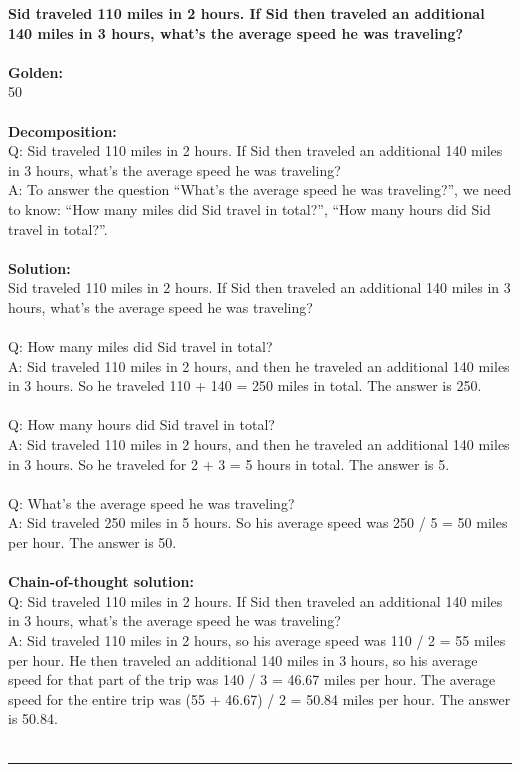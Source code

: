 \noindent
\textbf{Sid traveled 110 miles in 2 hours. If Sid then traveled an additional 140 miles in 3 hours, what's the average speed he was traveling?} \\
 \\
\textbf{Golden:} \\
50 \\
 \\
\textbf{Decomposition:} \\
Q: Sid traveled 110 miles in 2 hours. If Sid then traveled an additional 140 miles in 3 hours, what's the average speed he was traveling? \\
A: To answer the question ``What's the average speed he was traveling?'', we need to know: ``How many miles did Sid travel in total?'', ``How many hours did Sid travel in total?''. \\
 \\
\textbf{Solution:} \\
Sid traveled 110 miles in 2 hours. If Sid then traveled an additional 140 miles in 3 hours, what's the average speed he was traveling? \\
 \\
Q: How many miles did Sid travel in total? \\
A: Sid traveled 110 miles in 2 hours, and then he traveled an additional 140 miles in 3 hours. So he traveled 110 + 140 = 250 miles in total. The answer is 250. \\
 \\
Q: How many hours did Sid travel in total? \\
A: Sid traveled 110 miles in 2 hours, and then he traveled an additional 140 miles in 3 hours. So he traveled for 2 + 3 = 5 hours in total. The answer is 5. \\
 \\
Q: What's the average speed he was traveling? \\
A: Sid traveled 250 miles in 5 hours. So his average speed was 250 / 5 = 50 miles per hour. The answer is 50. \\
 \\
\textbf{Chain-of-thought solution:} \\
Q: Sid traveled 110 miles in 2 hours. If Sid then traveled an additional 140 miles in 3 hours, what's the average speed he was traveling? \\
A: Sid traveled 110 miles in 2 hours, so his average speed was 110 / 2 = 55 miles per hour. He then traveled an additional 140 miles in 3 hours, so his average speed for that part of the trip was 140 / 3 = 46.67 miles per hour. The average speed for the entire trip was (55 + 46.67) / 2 = 50.84 miles per hour. The answer is 50.84. \\
 \\
\hrule \bigskip

